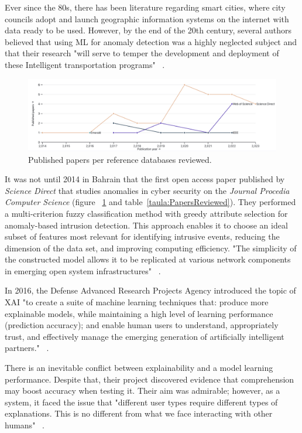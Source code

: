 \documentclass[a4paper,12pt,twoside]{ThesisStyle}
\begin{document}
Ever since the 80s, there has been literature regarding smart cities, where city councils adopt and launch geographic information systems on the internet with data ready to be used. However, by the end of the 20th century, several authors believed that using ML for anomaly detection was a highly neglected subject and that their research "will serve to temper the development and deployment of these Intelligent transportation programs" ~\cite{GARCIAORTIZ199511}. 

\begin{figure}[htb]
\centering
\includegraphics[width=13 cm]{imatges/publicationDB.png}
\caption{\label{fig:publicationDB} Published papers per reference databases reviewed.}
\end{figure}

It was not until 2014 in Bahrain that the first open access paper published by \textit{Science Direct} that studies anomalies in cyber security on the \textit{Journal Procedia Computer Science} (figure ~\ref{fig:publicationDB} and table~\ref{taula:PapersReviewed}). They performed a multi-criterion fuzzy classification method with greedy attribute selection for anomaly-based intrusion detection. This approach enables it to choose an ideal subset of features most relevant for identifying intrusive events, reducing the dimension of the data set, and improving computing efficiency. "The simplicity of the constructed model allows it to be replicated at various network components in emerging open system infrastructures" ~\cite{el2014multicriterion}.

In 2016, the Defense Advanced Research Projects Agency introduced the topic of XAI "to create a suite of machine learning techniques that: produce more explainable models, while maintaining a high level of learning performance (prediction accuracy); and enable human users to understand, appropriately trust, and effectively manage the emerging generation of artificially intelligent partners." ~\cite{DAR2016}. 

There is an inevitable conflict between explainability and a model learning performance. Despite that, their project discovered evidence that comprehension may boost accuracy when testing it. Their aim was admirable; however, as a system, it faced the issue that "different user types require different types of explanations. This is no different from what we face interacting with other humans" ~\cite{gunning2021darpa}.
\end{document}
